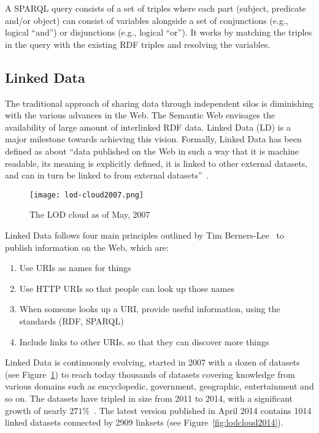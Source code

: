 A SPARQL query consists of a set of triples where each part (subject, predicate and/or object) can consist of variables alongside a set of conjunctions (e.g., logical ``and'') or disjunctions (e.g., logical ``or''). It works by matching the triples in the query with the existing RDF triples and resolving the variables.

\subsection{Linked Data}

The traditional approach of sharing data through independent silos is diminishing with the various advances in the Web. The Semantic Web envisages the availability of large amount of interlinked RDF data. Linked Data (LD) is a major milestone towards achieving this vision. Formally, Linked Data has been defined as about ``data published on the Web in such a way that it is machine readable, its meaning is explicitly defined, it is linked to other external datasets, and can in turn be linked to from external datasets''~\cite{Bizer:IJSWIS:09}.

\begin{figure}[ht!]
	\texttt{[image: lod-cloud2007.png]}
	\caption{The LOD cloud as of May, 2007}
	\label{fig:lodcloud2007}
\end{figure}

Linked Data follows four main principles outlined by Tim Berners-Lee~\cite{Berners-Lee:W3C:06} to publish information on the Web, which are:

\begin{enumerate}
	\item Use URIs as names for things
	\item Use HTTP URIs so that people can look up those names
	\item When someone looks up a URI, provide useful information, using the standards (RDF, SPARQL)
	\item Include links to other URIs. so that they can discover more things
\end{enumerate}

Linked Data is continuously evolving, started in 2007 with a dozen of datasets (see Figure~\ref{fig:lodcloud2007}) to reach today thousands of datasets covering knowledge from various domains such as encyclopedic, government, geographic, entertainment and so on. The datasets have tripled in size from 2011 to 2014, with a significant growth of nearly $271\%$~\cite{Schmachtenberg:ISWC:14}. The latest version published in April 2014 contains 1014 linked datasets connected by 2909 linksets (see Figure~\ref{fig:lodcloud2014}).

